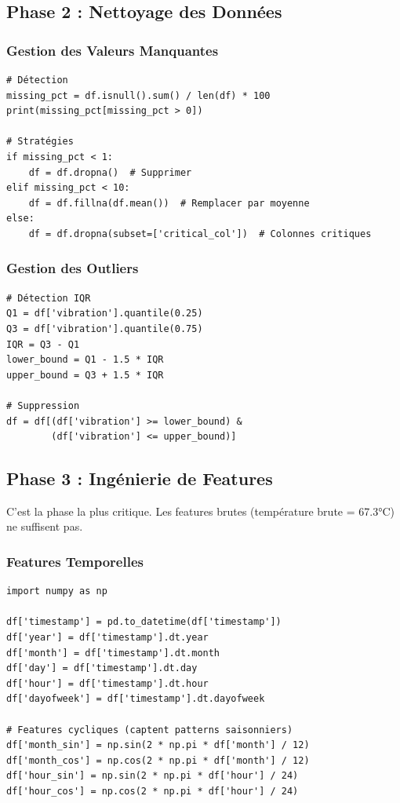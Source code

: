 \documentclass[12pt,a4paper,french]{article}
\begin{document}
\subsection{Phase 2 : Nettoyage des Données}

\subsubsection{Gestion des Valeurs Manquantes}

\begin{lstlisting}
# Détection
missing_pct = df.isnull().sum() / len(df) * 100
print(missing_pct[missing_pct > 0])

# Stratégies
if missing_pct < 1:
    df = df.dropna()  # Supprimer
elif missing_pct < 10:
    df = df.fillna(df.mean())  # Remplacer par moyenne
else:
    df = df.dropna(subset=['critical_col'])  # Colonnes critiques
\end{lstlisting}

\subsubsection{Gestion des Outliers}

\begin{lstlisting}
# Détection IQR
Q1 = df['vibration'].quantile(0.25)
Q3 = df['vibration'].quantile(0.75)
IQR = Q3 - Q1
lower_bound = Q1 - 1.5 * IQR
upper_bound = Q3 + 1.5 * IQR

# Suppression
df = df[(df['vibration'] >= lower_bound) & 
        (df['vibration'] <= upper_bound)]
\end{lstlisting}

\subsection{Phase 3 : Ingénierie de Features}

C'est la phase la plus critique. Les features brutes (température brute = 67.3°C) ne suffisent pas.

\subsubsection{Features Temporelles}

\begin{lstlisting}
import numpy as np

df['timestamp'] = pd.to_datetime(df['timestamp'])
df['year'] = df['timestamp'].dt.year
df['month'] = df['timestamp'].dt.month
df['day'] = df['timestamp'].dt.day
df['hour'] = df['timestamp'].dt.hour
df['dayofweek'] = df['timestamp'].dt.dayofweek

# Features cycliques (captent patterns saisonniers)
df['month_sin'] = np.sin(2 * np.pi * df['month'] / 12)
df['month_cos'] = np.cos(2 * np.pi * df['month'] / 12)
df['hour_sin'] = np.sin(2 * np.pi * df['hour'] / 24)
df['hour_cos'] = np.cos(2 * np.pi * df['hour'] / 24)
\end{lstlisting}
\end{document}
